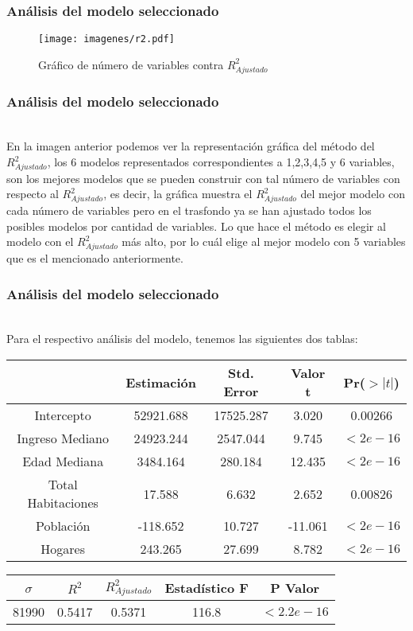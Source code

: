 \documentclass[12pt]{beamer}
\begin{document}
\begin{frame}
\frametitle{Análisis del modelo seleccionado}
\begin{figure}[h]
  \centering
  \texttt{[image: imagenes/r2.pdf]}
  \caption{Gráfico de número de variables contra $R^2_{Ajustado}$}\label{figura1}
\end{figure}
\end{frame}

\begin{frame}
\frametitle{Análisis del modelo seleccionado}
~\\En la imagen anterior podemos ver la representación gráfica del método del $R^2_{Ajustado}$, los 6 modelos representados correspondientes a 1,2,3,4,5 y 6 variables, son los mejores modelos que se pueden construir con tal número de variables con respecto al $R^2_{Ajustado}$, es decir, la gráfica muestra el $R^2_{Ajustado}$ del mejor modelo con cada número de variables pero en el trasfondo ya se han ajustado todos los posibles modelos por cantidad de variables. Lo que hace el método es elegir al modelo con el $R^2_{Ajustado}$ más alto, por lo cuál elige al mejor modelo con 5 variables que es el mencionado anteriormente.
\end{frame}

\begin{frame}
\frametitle{Análisis del modelo seleccionado}
~\\Para el respectivo análisis del modelo, tenemos las siguientes dos tablas:
\begin{center}
\begin{tabular}{|ccccc|}
\hline 
 & Estimación & Std. Error & Valor t & Pr($>|t|$) \\ 
\hline 
Intercepto & 52921.688 & 17525.287 & 3.020 & 0.00266 \\ 
Ingreso Mediano & 24923.244 & 2547.044 & 9.745 & $<2e-16$ \\  
Edad Mediana & 3484.164 & 280.184 & 12.435 & $<2e-16$ \\ 
Total Habitaciones & 17.588 & 6.632 & 2.652 & 0.00826 \\ 
Población & -118.652 & 10.727 & -11.061 & $<2e-16$ \\  
Hogares & 243.265 & 27.699 & 8.782 & $<2e-16$ \\ 
\hline 
\end{tabular} 
\end{center}
\begin{center}
\begin{tabular}{|c|c|c|c|c|}
\hline 
$\hat{\sigma}$ & $R^2$ & $R^2_{Ajustado}$ & Estadístico F & P Valor \\ 
\hline 
81990 & 0.5417 & 0.5371 & 116.8 & $<2.2e-16$ \\ 
\hline 
\end{tabular} 
\end{center}
\end{frame}
\end{document}
